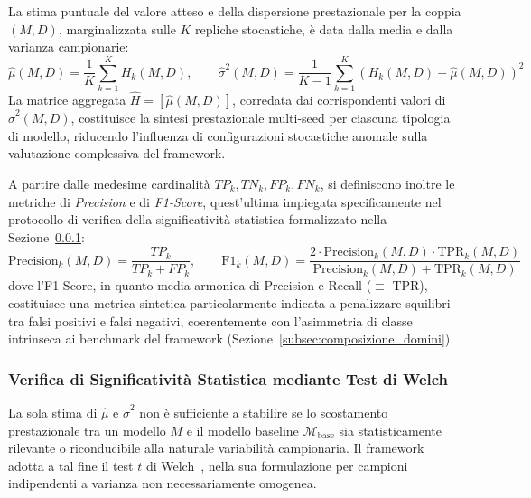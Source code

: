 La stima puntuale del valore atteso e della dispersione prestazionale per la coppia $(M,D)$, marginalizzata sulle $K$ repliche stocastiche, è data dalla media e dalla varianza campionarie:
\begin{equation}
    \hat{\mu}(M, D) = \frac{1}{K} \sum_{k=1}^{K} H_k(M, D), \qquad \hat{\sigma}^2(M, D) = \frac{1}{K-1} \sum_{k=1}^{K} \left( H_k(M, D) - \hat{\mu}(M, D) \right)^2
    \label{eq:mean_var_multiseed}
\end{equation}
La matrice aggregata $\hat{H} = [\hat{\mu}(M,D)]$, corredata dai corrispondenti valori di $\hat{\sigma}^2(M,D)$, costituisce la sintesi prestazionale multi-seed per ciascuna tipologia di modello, riducendo l'influenza di configurazioni stocastiche anomale sulla valutazione complessiva del framework.

A partire dalle medesime cardinalità $TP_k, TN_k, FP_k, FN_k$, si definiscono inoltre le metriche di \textit{Precision} e di \textit{F1-Score}, quest'ultima impiegata specificamente nel protocollo di verifica della significatività statistica formalizzato nella Sezione~\ref{subsubsec:welch_test}:
\begin{equation}
    \text{Precision}_k(M, D) = \frac{TP_k}{TP_k + FP_k}, \qquad \text{F1}_k(M, D) = \frac{2 \cdot \text{Precision}_k(M,D) \cdot \text{TPR}_k(M,D)}{\text{Precision}_k(M,D) + \text{TPR}_k(M,D)}
    \label{eq:precision_f1_def}
\end{equation}
dove l'F1-Score, in quanto media armonica di Precision e Recall ($\equiv$ TPR), costituisce una metrica sintetica particolarmente indicata a penalizzare squilibri tra falsi positivi e falsi negativi, coerentemente con l'asimmetria di classe intrinseca ai benchmark del framework (Sezione~\ref{subsec:composizione_domini}).

\subsubsection{Verifica di Significatività Statistica mediante Test di Welch}
\label{subsubsec:welch_test}
La sola stima di $\hat{\mu}$ e $\hat{\sigma}^2$ non è sufficiente a stabilire se lo scostamento prestazionale tra un modello $M$ e il modello baseline $\mathcal{M}_{\text{base}}$ sia statisticamente rilevante o riconducibile alla naturale variabilità campionaria. Il framework adotta a tal fine il test $t$ di Welch~\cite{welch1947}, nella sua formulazione per campioni indipendenti a varianza non necessariamente omogenea.

